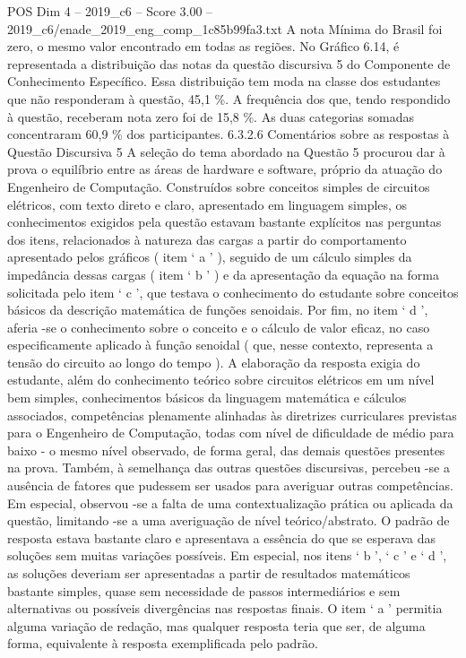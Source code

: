 \begin{textsample}{POS Dim 4 – 2019\_c6 – Score 3.00 – 2019\_c6/enade\_2019\_eng\_comp\_1c85b99fa3.txt}
A nota Mínima do Brasil foi zero, o mesmo valor encontrado em todas as regiões.
No Gráfico 6.14, é representada a distribuição das notas da questão discursiva 5 do Componente de Conhecimento Específico.
Essa distribuição tem moda na classe dos estudantes que não responderam à questão, 45,1 \%.
A frequência dos que, tendo respondido à questão, receberam nota zero foi de 15,8 \%.
As duas categorias somadas concentraram 60,9 \% dos participantes. 6.3.2.6 Comentários sobre as respostas à Questão Discursiva 5 A seleção do tema abordado na Questão 5 procurou dar à prova o equilíbrio entre as áreas de hardware e software, próprio da atuação do Engenheiro de Computação.
Construídos sobre conceitos simples de circuitos elétricos, com texto direto e claro, apresentado em linguagem simples, os conhecimentos exigidos pela questão estavam bastante explícitos nas perguntas dos itens, relacionados à natureza das cargas a partir do comportamento apresentado pelos gráficos ( item ‘ a ’ ), seguido de um cálculo simples da impedância dessas cargas ( item ‘ b ’ ) e da apresentação da equação na forma solicitada pelo item ‘ c ’, que testava o conhecimento do estudante sobre conceitos básicos da descrição matemática de funções senoidais.
Por fim, no item ‘ d ’, aferia -se o conhecimento sobre o conceito e o cálculo de valor eficaz, no caso especificamente aplicado à função senoidal ( que, nesse contexto, representa a tensão do circuito ao longo do tempo ).
A elaboração da resposta exigia do estudante, além do conhecimento teórico sobre circuitos elétricos em um nível bem simples, conhecimentos básicos da linguagem matemática e cálculos associados, competências plenamente alinhadas às diretrizes curriculares previstas para o Engenheiro de Computação, todas com nível de dificuldade de médio para baixo - o mesmo nível observado, de forma geral, das demais questões presentes na prova.
Também, à semelhança das outras questões discursivas, percebeu -se a ausência de fatores que pudessem ser usados para averiguar outras competências.
Em especial, observou -se a falta de uma contextualização prática ou aplicada da questão, limitando -se a uma averiguação de nível teórico/abstrato.
O padrão de resposta estava bastante claro e apresentava a essência do que se esperava das soluções sem muitas variações possíveis.
Em especial, nos itens ‘ b ’, ‘ c ’ e ‘ d ’, as soluções deveriam ser apresentadas a partir de resultados matemáticos bastante simples, quase sem necessidade de passos intermediários e sem alternativas ou possíveis divergências nas respostas finais.
O item ‘ a ’ permitia alguma variação de redação, mas qualquer resposta teria que ser, de alguma forma, equivalente à resposta exemplificada pelo padrão.

\end{textsample}
